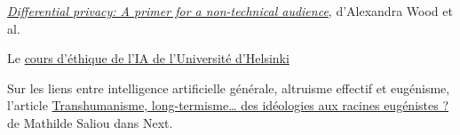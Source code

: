 \begin{plusloin}
  \item \href{https://papers.ssrn.com/sol3/papers.cfm?abstract_id=3338027}{\textit{\NoAutoSpaceBeforeFDP Differential privacy: A primer for a non-technical audience}}, d'Alexandra Wood et al.
  \item Le \href{https://ethics-of-ai.mooc.fi/start}{cours d'éthique de l'IA de l'Université d'Helsinki}
  \item Sur les liens entre intelligence artificielle générale, altruisme effectif et eugénisme, l'article \href{https://next.ink/135296/transhumanisme-long-termisme-des-ideologies-aux-racines-eugenistes/}{Trans\-hu\-ma\-ni\-sme, long-termisme… des idéologies aux racines eugénistes ?} de Mathilde Saliou dans Next.
\end{plusloin}




